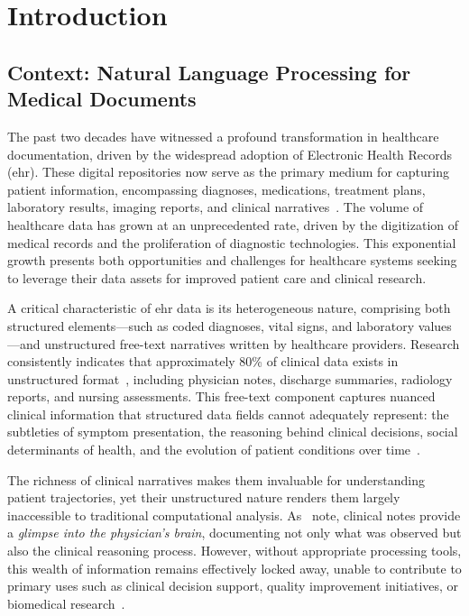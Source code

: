 \chapter{Introduction}
\label{chap:intro}
\adjustmtc[2]
\minitoc

\section{Context: Natural Language Processing for Medical Documents}

The past two decades have witnessed a profound transformation in healthcare documentation, driven by the widespread adoption of Electronic Health Records (\gls{ehr}). These digital repositories now serve as the primary medium for capturing patient information, encompassing diagnoses, medications, treatment plans, laboratory results, imaging reports, and clinical narratives~\citep{shickel2018deep, wu2020deep}. The volume of healthcare data has grown at an unprecedented rate, driven by the digitization of medical records and the proliferation of diagnostic technologies. This exponential growth presents both opportunities and challenges for healthcare systems seeking to leverage their data assets for improved patient care and clinical research.

A critical characteristic of \gls{ehr} data is its heterogeneous nature, comprising both structured elements—such as coded diagnoses, vital signs, and laboratory values—and unstructured free-text narratives written by healthcare providers. Research consistently indicates that approximately 80\% of clinical data exists in unstructured format~\citep{kong2019managing, wu2022neural}, including physician notes, discharge summaries, radiology reports, and nursing assessments. This free-text component captures nuanced clinical information that structured data fields cannot adequately represent: the subtleties of symptom presentation, the reasoning behind clinical decisions, social determinants of health, and the evolution of patient conditions over time~\citep{wang2018clinical, dalianis2018clinical}.

The richness of clinical narratives makes them invaluable for understanding patient trajectories, yet their unstructured nature renders them largely inaccessible to traditional computational analysis. As~\citet{yang2022large} note, clinical notes provide a \textit{glimpse into the physician's brain}, documenting not only what was observed but also the clinical reasoning process. However, without appropriate processing tools, this wealth of information remains effectively locked away, unable to contribute to primary uses such as clinical decision support, quality improvement initiatives, or biomedical research~\citep{wu2022neural, yadav2018mining}.

